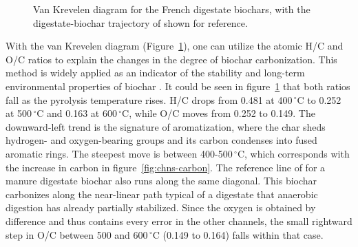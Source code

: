 \begin{figure}[ht]
\centering
{}
\caption{Van Krevelen diagram for the French digestate biochars, with the digestate-biochar trajectory of \textcite{kujawska-2026} shown for reference.}
\label{fig:chns-vankrevelen}
\end{figure}

With the van Krevelen diagram (Figure~\ref{fig:chns-vankrevelen}), one can utilize the atomic H/C and O/C ratios to explain the changes in the degree of biochar carbonization. This method is widely applied as an indicator of the stability and long-term environmental properties of biochar \cite{kumar-2024}. It could be seen in figure~\ref{fig:chns-vankrevelen} that both ratios fall as the pyrolysis temperature rises. H/C drops from 0.481 at 400\,$^{\circ}$C to 0.252 at 500\,$^{\circ}$C and 0.163 at 600\,$^{\circ}$C, while O/C moves from 0.252 to 0.149. The downward-left trend is the signature of aromatization, where the char sheds hydrogen- and oxygen-bearing groups and its carbon condenses into fused aromatic rings. The steepest move is between 400-500\,$^{\circ}$C, which corresponds with the increase in carbon in figure~\ref{fig:chns-carbon}. The reference line of \textcite{kujawska-2026} for a manure digestate biochar also runs along the same diagonal. This biochar carbonizes along the near-linear path typical of a digestate that anaerobic digestion has already partially stabilized.
Since the oxygen is obtained by difference and thus contains every error in the other channels, the small rightward step in O/C between 500 and 600\,$^{\circ}$C (0.149 to 0.164) falls within that case. 

